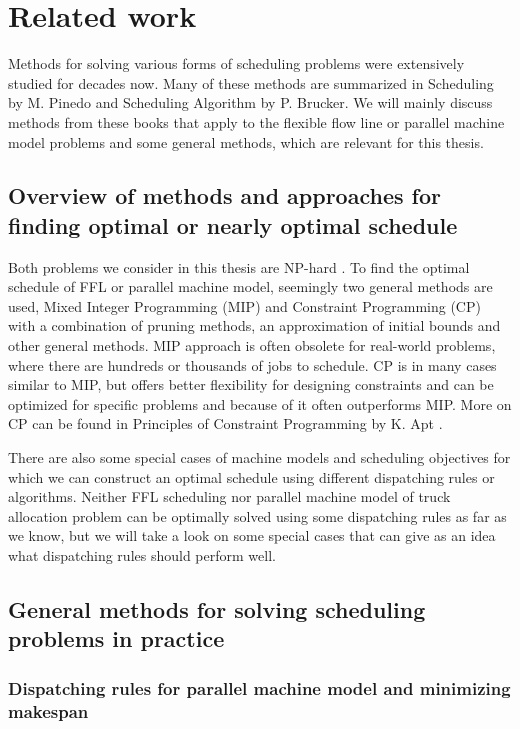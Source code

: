 \documentclass{ctuthesis}
\begin{document}
\chapter{Related work}
\label{chap:Related work}
Methods for solving various forms of scheduling problems were extensively studied for decades now. Many of these methods are summarized in Scheduling by M. Pinedo \cite{pinedo} and Scheduling Algorithm by P. Brucker\cite{brucker}. We will mainly discuss methods from these books that apply to the flexible flow line or parallel machine model problems and some general methods, which are relevant for this thesis. 

\section{Overview of methods and approaches for finding optimal or nearly optimal schedule}

Both problems we consider in this thesis are NP-hard \cite{pinedo}. To find the optimal schedule of FFL or parallel machine model, seemingly two general methods are used, Mixed Integer Programming (MIP) and Constraint Programming (CP) with a combination of pruning methods, an approximation of initial bounds and other general methods. MIP approach is often obsolete for real-world problems, where there are hundreds or thousands of jobs to schedule. CP is in many cases similar to MIP, but offers better flexibility for designing constraints and can be optimized for specific problems and because of it often outperforms MIP. More on CP can be found in Principles of Constraint Programming by K. Apt \cite{cp}.

There are also some special cases of machine models and scheduling objectives for which we can construct an optimal schedule using different dispatching rules or algorithms. Neither FFL scheduling nor parallel machine model of truck allocation problem can be optimally solved using some dispatching rules as far as we know, but we will take a look on some special cases that can give as an idea what dispatching rules should perform well.

\section{General methods for solving scheduling problems in practice}

\subsection{Dispatching rules for parallel machine model and minimizing makespan}
\end{document}
